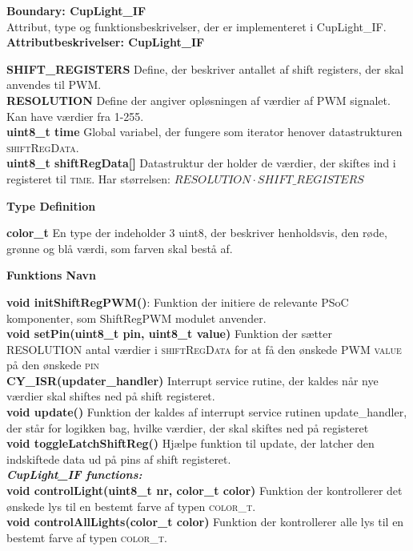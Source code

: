 \documentclass[Softwaredesign/Softwaredesign_main.tex]{subfiles}
\begin{document}
{\large\textbf{Boundary:  CupLight\_IF}}\\
Attribut, type og funktionsbeskrivelser, der er implementeret i CupLight\_IF.\\
{\large\textbf{Attributbeskrivelser: CupLight\_IF}}
\begin{adjustwidth}{1cm}{0pt}
\textbf{SHIFT\_REGISTERS} Define, der beskriver antallet af shift registers, der skal anvendes til PWM. \\[0.2cm]
\textbf{RESOLUTION} Define der angiver opløsningen af værdier af PWM signalet. Kan have værdier fra 1-255.\\[0.2cm]
\textbf{uint8\_t time} Global variabel, der fungere som iterator henover datastrukturen \textsc{shiftRegData}.\\[0.2cm]
\textbf{uint8\_t shiftRegData{[}{]}} Datastruktur der holder de værdier, der skiftes ind i registeret til \textsc{time}. Har størrelsen: $RESOLUTION\cdot SHIFT\_REGISTERS$\\
\end{adjustwidth}
{\large\textbf{Type Definition}}
\begin{adjustwidth}{1cm}{0pt}
\textbf{color\_t} En type der indeholder 3 uint8, der beskriver henholdsvis, den røde, grønne og blå værdi, som farven skal bestå af.\\[0.2cm]
\end{adjustwidth}
{\large\textbf{Funktions Navn}}
\begin{adjustwidth}{1cm}{0pt}
\textbf{void initShiftRegPWM()}: Funktion der initiere de relevante PSoC komponenter, som ShiftRegPWM modulet anvender.\\[0.2cm]
\textbf{void setPin(uint8\_t pin, uint8\_t value)} Funktion der sætter \textsc{RESOLUTION} antal værdier i \textsc{shiftRegData} for at få den ønskede PWM \textsc{value} på den ønskede \textsc{pin}\\[0.2cm]
\textbf{CY\_ISR(updater\_handler)} Interrupt service rutine, der kaldes når nye værdier skal shiftes ned på shift registeret.\\[0.2cm]
\textbf{void update()} Funktion der kaldes af interrupt service rutinen update\_handler, der står for logikken bag, hvilke værdier, der skal skiftes ned på registeret\\[0.2cm]
\textbf{void toggleLatchShiftReg()} Hjælpe funktion til update, der latcher den indskiftede data ud på pins af shift registeret.\\ [0.2cm]
\textbf{\textit{CupLight\_IF functions:}}\\[0.2cm]
\textbf{void controlLight(uint8\_t nr, color\_t color)} Funktion der kontrollerer det ønskede lys til en bestemt farve af typen \textsc{color\_t}.\\ [0.2cm] 
\textbf{void controlAllLights(color\_t color)} Funktion der kontrollerer alle lys til en bestemt farve af typen \textsc{color\_t}.\\ 

\end{adjustwidth}
\end{document}
